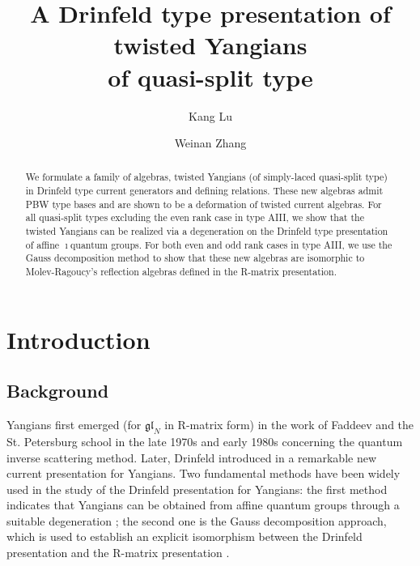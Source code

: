 \documentclass[11pt,reqno]{amsart}
\numberwithin{equation}{section}
\theoremstyle{definition}
\theoremstyle{remark}
\newcommand{\gl}{\mathfrak{gl}}
\begin{document}
\pagestyle{myheadings}
\setcounter{page}{1}

\title[Twisted Yangians of quasi-split type]{A Drinfeld type presentation of twisted Yangians\\
of quasi-split type}

\author{Kang Lu}
\address{Department of Mathematics, University of Virginia, 
Charlottesville, VA 22903, USA}

\author{Weinan Zhang}
\address{Department of Mathematics and New Cornerstone
Science Laboratory, The University of Hong Kong, Hong Kong SAR, P.R.China}

		
\begin{abstract}
We formulate a family of algebras, twisted Yangians (of simply-laced quasi-split type) in Drinfeld type current generators and defining relations. These new algebras admit PBW type bases and are shown to be a deformation of twisted current algebras. For all quasi-split types excluding the even rank case in type AIII, we show that the twisted Yangians can be realized via a degeneration on the Drinfeld type presentation of affine $\imath$quantum groups. For both even and odd rank cases in type AIII, we use the Gauss decomposition method to show that these new algebras are isomorphic to Molev-Ragoucy's reflection algebras defined in the R-matrix presentation. %
\end{abstract}
	
\maketitle
\setcounter{tocdepth}{1}
\tableofcontents

\thispagestyle{empty}
\section{Introduction}
\subsection{Background}
Yangians first emerged (for $\gl_N$ in R-matrix form) in the work of Faddeev and the St. Petersburg school in the late 1970s and early 1980s concerning the quantum inverse scattering method. Later, Drinfeld introduced in \cite{Dr88} a remarkable new current presentation for Yangians. Two fundamental methods have been widely used in the study of the Drinfeld presentation for Yangians: the first method indicates that Yangians can be obtained from affine quantum groups through a suitable degeneration \cite{Dr87,GM12,GTL13}; the second one is the Gauss decomposition approach, which is used to establish an explicit isomorphism between the Drinfeld presentation and the R-matrix presentation \cite{BK05,JLM18,FT23}. 
\end{document}
